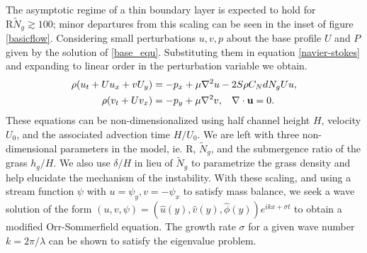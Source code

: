 \documentclass[aps,prl,twocolumn,superscriptaddress,10pt]{revtex4-1}  %
\newcommand{\bu}{\mathbf{u}}
\newcommand{\Rey}{\text{R}}
\newcommand{\Ndg}{\tilde{N}_g}
\begin{document}
The asymptotic regime of a thin boundary layer is expected to hold for $\Rey \Ndg \gtrsim 100$; minor departures from this scaling can be seen in the inset of figure \ref{basicflow}.
\newline
Considering small perturbations $u, v, p$ about the base profile $U$ and $P$ given by the solution of \eqref{base_equ}. Substituting them in equation \eqref{navier-stokes} and expanding  to linear order in the perturbation variable we obtain.
\begin{equation}
\begin{split}
\rho(u_t+U u_x+vU_y) &= -p_x+ {\mu}\nabla^2u-2S\rho C_{N}dN_{g}Uu, \\
\rho(v_t+ Uv_x) &= -p_y+ {\mu}\nabla^2v, \hspace{0.3cm} \nabla\cdot\bu=0.
\end{split}
\end{equation}
These equations can be non-dimensionalized using half channel height $H$, velocity $U_0$, and the associated advection time $H/U_0$. 
We are left with three non-dimensional parameters in the model, ie. $\Rey$, $\Ndg$, and the submergence ratio of the grass $h_g/H$. 
We also use $\delta/H$ in lieu of $\Ndg$ to parametrize the grass density and help elucidate the mechanism of the instability. 
With these scaling, and using a stream function $\psi$ with $u = \psi_{y}, v= -\psi_x$ to satisfy mass balance, we seek a wave solution of 
the form $\left(u,v,\psi \right)= \left(\hat u(y), \hat v(y), \hat\phi(y) \right)e^{ikx+\sigma t}$ to  obtain a modified Orr-Sommerfield equation. 
The growth rate $\sigma$ for a given wave number $k=2\pi /\lambda$ can be shown to satisfy the eigenvalue problem.
\end{document}
